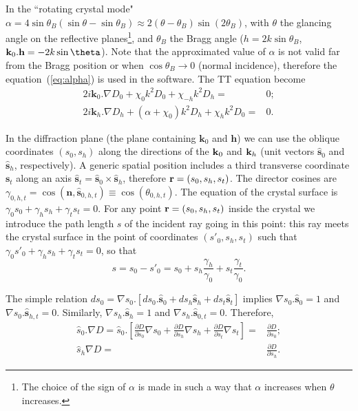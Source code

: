 \documentclass[preprint]{iucr}              %
\begin{document}
In the ``rotating crystal mode" $\alpha=4 \sin \theta_B (\sin \theta - \sin \theta_B) \approx 2 (\theta-\theta_B) \sin (2\theta_B)$, with $\theta$ the glancing angle on the reflective planes\footnote{
The choice of the sign of $\alpha$ is made in such a way that $\alpha$ increases when $\theta$ increases. 
}, and $\theta_B$ the Bragg angle ($h=2 k \sin\theta_B$, $\textbf k_0 . \textbf h = -2 k \sin\theta$).
Note that the approximated value of $\alpha$ is not valid far from the Bragg position or when $\cos\theta_B \rightarrow 0$ (normal incidence), therefore the equation~(\ref{eq:alpha}) is used in the software.
The TT equation become
\begin{subequations}
\label{eq:TTvectorAlpha}
\begin{align}
2 i \textbf{k}_0 . \nabla D_0 + \chi_0 k^2 D_0 + \chi_{-h} k^2 D_h =& 0; \\
2 i \textbf{k}_h . \nabla D_h + (\alpha + \chi_0) k^2 D_h + \chi_{h} k^2 D_0 =& 0.
\end{align}
\end{subequations}

In the diffraction plane (the plane containing $\textbf{k}_0$ and $\textbf{h}$) 
we can use the oblique coordinates $(s_0,s_h)$ along the directions of the $\textbf k_0$ and $\textbf k_h$ (unit vectors $\hat{ \textbf{s}}_{0}$ and $\hat{ \textbf{s}}_{h}$, respectively). A generic spatial position includes a third transverse coordinate $\textbf{s}_t$ along an axis $\hat{\textbf{s}}_t=\hat{\textbf{s}}_0 \times \hat{\textbf{s}}_h$, therefore $\textbf r=(s_0,s_h,s_t)$. The director cosines are $\gamma_{0,h,t}=\cos(\textbf{n} , \hat{\textbf{s}}_{0,h,t}) \equiv \cos(\theta_{0,h,t})$. The equation of the crystal surface is $\gamma_0 s_0 + \gamma_h s_h + \gamma_t s_t=0$. For any point $\textbf r=(s_0,s_h,s_t)$ inside the crystal we introduce the path length $s$ of the incident ray going in this point: this ray meets the crystal surface in the point of coordinates $(s'_0,s_h,s_t)$ such that $\gamma_0 s'_0+\gamma_h s_h + \gamma_t s_t=0$, so that 
\begin{equation}
\label{eq:s}
s = s_0 - s'_0 = s_0 + s_h \frac{\gamma_h}{\gamma_0} + s_t \frac{\gamma_t}{\gamma_0}.
\end{equation}

The simple relation $d s_0 = \nabla s_0 . [ d s_0 . \hat{\textbf{s}}_0 + d s_h \hat{\textbf{s}}_h + d s_t \hat{\textbf{s}}_t ]$ implies $\nabla s_0 . \hat{\textbf{s}}_0=1$ and $\nabla s_0 . \hat{\textbf{s}}_{h,t}=0$. Similarly, $\nabla s_h . \hat{\textbf{s}}_h=1$ and $\nabla s_h . \hat{\textbf{s}}_{0,t}=0$. Therefore, 
\begin{subequations}
\label{eq:equalities}
\begin{align}
\hat s_0 . \nabla D=
\hat s_0 . \left[ 
\frac{\partial D}{\partial s_0} \nabla s_0 + 
\frac{\partial D}{\partial s_h} \nabla s_h +
\frac{\partial D}{\partial s_t} \nabla s_t
\right] 
=& \frac{\partial D}{\partial s_0}
; \\
\hat s_h \nabla D =& 
\frac{\partial D}{\partial s_h}.
\end{align}
\end{subequations}
\end{document}
